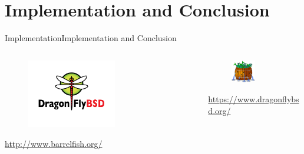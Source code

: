 \documentclass[10pt]{beamer}
\begin{document}
\section{Implementation and Conclusion}
\begin{frame}{Implementation}{Implementation and Conclusion}
  \begin{columns}[T]
    \begin{column}{.5\textwidth}
      \begin{figure}[ht]
        \centering
        \includegraphics[width=0.6\textwidth, keepaspectratio=true]{images/DragonFlyBSD.png}
      \end{figure}
      \url{http://www.barrelfish.org/}
    \end{column}

    \pause

    \hfill
    \begin{column}{.5\textwidth}
      \begin{figure}[ht]
        \centering
        \includegraphics[width=0.5\textwidth, keepaspectratio=true]{images/barrelfish.png}
      \end{figure}
      \url{https://www.dragonflybsd.org/}
    \end{column}
  \end{columns}
\end{frame}

{\1
\begin{frame}

\end{frame}}
\end{document}
